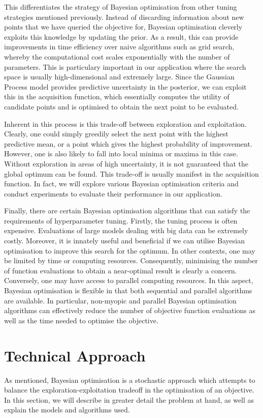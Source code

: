 \documentclass[letterpaper]{article}
\begin{document}
This differentiates the strategy of Bayesian optimisation from other tuning
strategies mentioned previously. Instead of discarding information about new points
that we have queried the objective for, Bayesian optimisation cleverly exploits this
knowledge by updating the prior. As a result, this can provide improvements in time
efficiency over naive algorithms such as grid search, whereby the computational
cost scales exponentially with the number of parameters.  This is particulary
important in our application where the search space is usually high-dimensional
and extremely large. Since the Gaussian Process model provides predictive uncertainty
in the posterior, we can exploit this in the acquisition function, which essentially
computes the utility of candidate points and is optimised to obtain the next point
to be evaluated.

Inherent in this process is this trade-off between exploration and exploitation.
Clearly, one could simply greedily select the next point with the highest predictive
mean, or a point which gives the highest probability of improvement. However, one
is also likely to fall into local minima or maxima in this case. Without exploration
in areas of high uncertainty, it is not guaranteed that the global optimum can be
found. This trade-off is usually manifest in the acquisition function. In fact,
we will explore various Bayesian optimisation criteria and conduct experiments to
evaluate their performance in our application.

Finally, there are certain Bayesian optimisation algorithms that can satisfy the
requirements of hyperparameter tuning. Firstly, the tuning process is often
expensive. Evaluations of large models dealing with big data can be extremely
costly. Moreover, it is innately useful and beneficial if we can utilise
Bayesian optimisation to improve this search for the optimum. In other contexts,
one may be limited by time or computing resources. Consequently, minimising the
number of function evaluations to obtain a near-optimal result is clearly a concern.
Conversely, one may have access to parallel computing resources. In this aspect,
Bayesian optimisation is flexible in that both sequential and parallel algorithms
are available. In particular, non-myopic and parallel Bayesian optimisation
algorithms can effectively reduce the number of objective function evaluations
as well as the time needed to optimise the objective.

\section{Technical Approach}
As mentioned, Bayesian optimisation is a stochastic approach which attempts to
balance the exploration-exploitation tradeoff in the optimisation of an objective.
In this section, we will describe in greater detail the problem at hand, as well
as explain the models and algorithms used.
\end{document}
